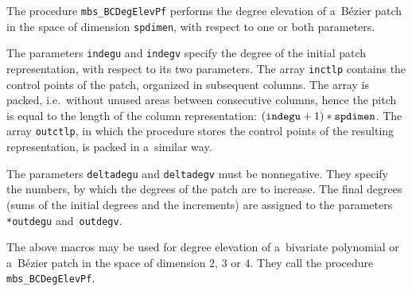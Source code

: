 \vspace{\bigskipamount}
The procedure \texttt{mbs\_BCDegElevPf} performs the degree elevation of
a~B\'{e}zier patch in the space of dimension \texttt{spdimen}, with respect to
one or both parameters.

The parameters \texttt{indegu} and \texttt{indegv} specify the degree of the
initial patch representation, with respect to its two parameters.
The array \texttt{inctlp} contains the control points of
the patch, organized in subsequent columns. The array is packed, i.e.\ without
unused areas between consecutive columns, hence the pitch is equal to the
length of the column representation:
$(\mathord{\mbox{\texttt{indegu}}}+1)*\mathord{\mbox{\texttt{spdimen}}}$.
The array \texttt{outctlp}, in which the procedure stores the control points of
the resulting representation, is packed in a~similar way.

The parameters \texttt{deltadegu} and \texttt{deltadegv} must be nonnegative.
They specify the numbers, by which the degrees of the patch are to increase.
The final degrees (sums of the initial degrees and the increments)
are assigned to the parameters \texttt{*outdegu} and~\texttt{outdegv}.


\vspace{\bigskipamount}
The above macros may be used for degree elevation of a~bivariate polynomial
or a~B\'{e}zier patch in the space of dimension $2$, $3$ or $4$.
They call the procedure \texttt{mbs\_BCDegElevPf}.


